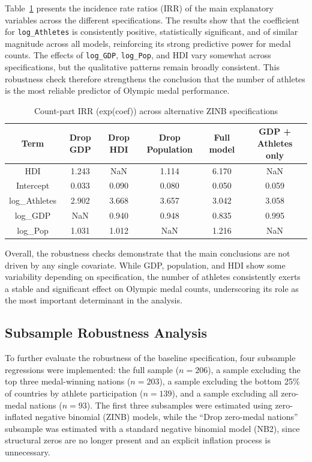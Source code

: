 \documentclass[11pt,twoside]{article}
\numberwithin{Theorem}{section}
\numberwithin{Definition}{section}
\numberwithin{Lemma}{section}
\numberwithin{Algorithm}{section}
\numberwithin{equation}{section}
\begin{document}
Table~\ref{tab:zinb_alt_specs_irr} presents the incidence rate ratios (IRR) of the main explanatory variables across the different specifications. The results show that the coefficient for \texttt{log\_Athletes} is consistently positive, statistically significant, and of similar magnitude across all models, reinforcing its strong predictive power for medal counts. The effects of \texttt{log\_GDP}, \texttt{log\_Pop}, and HDI vary somewhat across specifications, but the qualitative patterns remain broadly consistent. This robustness check therefore strengthens the conclusion that the number of athletes is the most reliable predictor of Olympic medal performance.

\begin{table}[H]
\centering
\caption{Count-part IRR (exp(coef)) across alternative ZINB specifications}
\label{tab:zinb_alt_specs_irr}
\begin{tabular}{cccccc}
\hline
Term           & Drop GDP & Drop HDI & Drop Population & Full model & GDP + Athletes only \\
\hline
HDI            & 1.243    & NaN      & 1.114           & 6.170      & NaN  \\
Intercept      & 0.033    & 0.090    & 0.080           & 0.050      & 0.059 \\
log\_Athletes  & 2.902    & 3.668    & 3.657           & 3.042      & 3.058 \\
log\_GDP       & NaN      & 0.940    & 0.948           & 0.835      & 0.995 \\
log\_Pop       & 1.031    & 1.012    & NaN             & 1.216      & NaN  \\
\hline
\end{tabular}
\end{table}

Overall, the robustness checks demonstrate that the main conclusions are not driven by any single covariate. While GDP, population, and HDI show some variability depending on specification, the number of athletes consistently exerts a stable and significant effect on Olympic medal counts, underscoring its role as the most important determinant in the analysis.


\subsection{Subsample Robustness Analysis}

To further evaluate the robustness of the baseline specification, four subsample regressions were implemented: the full sample ($n=206$), a sample excluding the top three medal-winning nations ($n=203$), a sample excluding the bottom 25\% of countries by athlete participation ($n=139$), and a sample excluding all zero-medal nations ($n=93$). The first three subsamples were estimated using zero-inflated negative binomial (ZINB) models, while the ``Drop zero-medal nations'' subsample was estimated with a standard negative binomial model (NB2), since structural zeros are no longer present and an explicit inflation process is unnecessary.  
\end{document}
